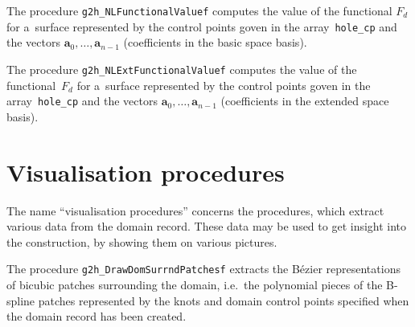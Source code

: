 \vspace{\bigskipamount}
The procedure \texttt{g2h\_NLFunctionalValuef} computes the value of
the functional $F_d$ for a~surface represented by
the control points goven in the array~\texttt{hole\_cp} and the vectors
$\bm{a}_0,\ldots,\bm{a}_{n-1}$ (coefficients in the basic space basis).

\vspace{\bigskipamount}
The procedure \texttt{g2h\_NLExtFunctionalValuef} computes the value of
the functional~$F_d$ for a~surface represented by
the control points goven in the array~\texttt{hole\_cp} and the vectors
$\bm{a}_0,\ldots,\bm{a}_{n-1}$ (coefficients in the extended space basis).

\vspace{\bigskipamount}

\vspace{\bigskipamount}

\section{Visualisation procedures}

The name ``visualisation procedures'' concerns the procedures, which extract
various data from the domain record. These data may be used to get insight
into the construction, by showing them on various pictures.

\vspace{\bigskipamount}
The procedure \texttt{g2h\_DrawDomSurrndPatchesf} extracts the B\'{e}zier
representations of bicubic patches surrounding the domain, i.e.\ the
polynomial pieces of the B-spline patches represented by the knots
and domain control points specified when the domain record has been
created.

